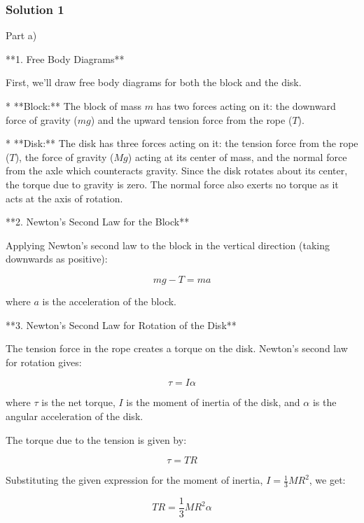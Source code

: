 \documentclass{article}
\begin{document}
\subsubsection{Solution 1}
Part a)

**1. Free Body Diagrams**

First, we'll draw free body diagrams for both the block and the disk.

* **Block:** The block of mass $m$ has two forces acting on it: the downward force of gravity ($mg$) and the upward tension force from the rope ($T$).

* **Disk:** The disk has three forces acting on it: the tension force from the rope ($T$), the force of gravity ($Mg$) acting at its center of mass, and the normal force from the axle which counteracts gravity.  Since the disk rotates about its center, the torque due to gravity is zero. The normal force also exerts no torque as it acts at the axis of rotation.

**2. Newton's Second Law for the Block**

Applying Newton's second law to the block in the vertical direction (taking downwards as positive):

\begin{equation*}
mg - T = ma
\end{equation*}

where $a$ is the acceleration of the block.

**3. Newton's Second Law for Rotation of the Disk**

The tension force in the rope creates a torque on the disk.  Newton's second law for rotation gives:

\begin{equation*}
\tau = I \alpha
\end{equation*}

where $\tau$ is the net torque, $I$ is the moment of inertia of the disk, and $\alpha$ is the angular acceleration of the disk.

The torque due to the tension is given by:

\begin{equation*}
\tau = TR
\end{equation*}

Substituting the given expression for the moment of inertia, $I=\frac{1}{3}MR^2$, we get:

\begin{equation*}
TR = \frac{1}{3}MR^2 \alpha
\end{equation*}
\end{document}
